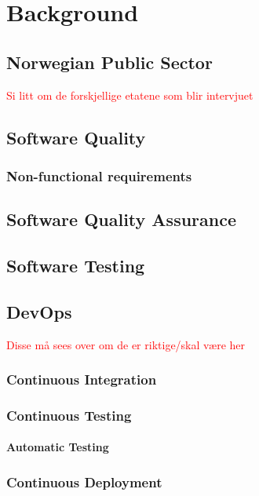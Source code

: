 \chapter{Background}

\section{Norwegian Public Sector}
\textcolor{red}{Si litt om de forskjellige etatene som blir intervjuet}

\section{Software Quality}

\subsection{Non-functional requirements}

\section{Software Quality Assurance}

\section{Software Testing}

\section{DevOps}

\textcolor{red}{Disse må sees over om de er riktige/skal være her}
\subsection{Continuous Integration}

\subsection{Continuous Testing}

\subsubsection{Automatic Testing}


\subsection{Continuous Deployment}